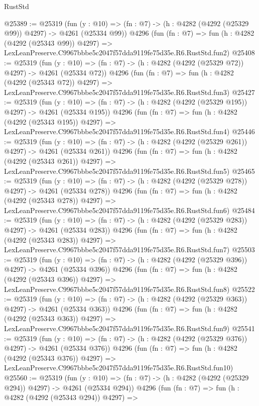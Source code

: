 \begin{lexlean}{RustStd}
\begin{coremodule}
@25389 := @25319
    (fun (y : @10) => (fn : @7) -> (h : @4282 (@4292 (@25329 @99)) @4297) -> @4261 (@25334 @99))
    @4296
    (fun (fn : @7) =>
    fun (h : @4282 (@4292 (@25343 @99)) @4297) =>
    LexLeanPreserve.C9967bbbe5c2047f57dda9119fe75d35e.R6.RustStd.fun2)
@25408 := @25319
    (fun (y : @10) => (fn : @7) -> (h : @4282 (@4292 (@25329 @72)) @4297) -> @4261 (@25334 @72))
    @4296
    (fun (fn : @7) =>
    fun (h : @4282 (@4292 (@25343 @72)) @4297) =>
    LexLeanPreserve.C9967bbbe5c2047f57dda9119fe75d35e.R6.RustStd.fun3)
@25427 := @25319
    (fun (y : @10) => (fn : @7) -> (h : @4282 (@4292 (@25329 @195)) @4297) -> @4261 (@25334 @195))
    @4296
    (fun (fn : @7) =>
    fun (h : @4282 (@4292 (@25343 @195)) @4297) =>
    LexLeanPreserve.C9967bbbe5c2047f57dda9119fe75d35e.R6.RustStd.fun4)
@25446 := @25319
    (fun (y : @10) => (fn : @7) -> (h : @4282 (@4292 (@25329 @261)) @4297) -> @4261 (@25334 @261))
    @4296
    (fun (fn : @7) =>
    fun (h : @4282 (@4292 (@25343 @261)) @4297) =>
    LexLeanPreserve.C9967bbbe5c2047f57dda9119fe75d35e.R6.RustStd.fun5)
@25465 := @25319
    (fun (y : @10) => (fn : @7) -> (h : @4282 (@4292 (@25329 @278)) @4297) -> @4261 (@25334 @278))
    @4296
    (fun (fn : @7) =>
    fun (h : @4282 (@4292 (@25343 @278)) @4297) =>
    LexLeanPreserve.C9967bbbe5c2047f57dda9119fe75d35e.R6.RustStd.fun6)
@25484 := @25319
    (fun (y : @10) => (fn : @7) -> (h : @4282 (@4292 (@25329 @283)) @4297) -> @4261 (@25334 @283))
    @4296
    (fun (fn : @7) =>
    fun (h : @4282 (@4292 (@25343 @283)) @4297) =>
    LexLeanPreserve.C9967bbbe5c2047f57dda9119fe75d35e.R6.RustStd.fun7)
@25503 := @25319
    (fun (y : @10) => (fn : @7) -> (h : @4282 (@4292 (@25329 @396)) @4297) -> @4261 (@25334 @396))
    @4296
    (fun (fn : @7) =>
    fun (h : @4282 (@4292 (@25343 @396)) @4297) =>
    LexLeanPreserve.C9967bbbe5c2047f57dda9119fe75d35e.R6.RustStd.fun8)
@25522 := @25319
    (fun (y : @10) => (fn : @7) -> (h : @4282 (@4292 (@25329 @363)) @4297) -> @4261 (@25334 @363))
    @4296
    (fun (fn : @7) =>
    fun (h : @4282 (@4292 (@25343 @363)) @4297) =>
    LexLeanPreserve.C9967bbbe5c2047f57dda9119fe75d35e.R6.RustStd.fun9)
@25541 := @25319
    (fun (y : @10) => (fn : @7) -> (h : @4282 (@4292 (@25329 @376)) @4297) -> @4261 (@25334 @376))
    @4296
    (fun (fn : @7) =>
    fun (h : @4282 (@4292 (@25343 @376)) @4297) =>
    LexLeanPreserve.C9967bbbe5c2047f57dda9119fe75d35e.R6.RustStd.fun10)
@25560 := @25319
    (fun (y : @10) => (fn : @7) -> (h : @4282 (@4292 (@25329 @294)) @4297) -> @4261 (@25334 @294))
    @4296
    (fun (fn : @7) =>
    fun (h : @4282 (@4292 (@25343 @294)) @4297) =>

\end{coremodule}
\end{lexlean}
